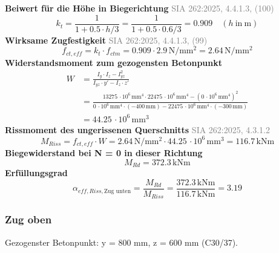 \documentclass[11pt,a4paper]{article}
\newcommand{\normref}[1]{{\small\textcolor{gray}{#1}}}
\begin{document}
\noindent\textbf{Beiwert für die Höhe in Biegerichtung} \hfill \normref{SIA 262:2025, 4.4.1.3, (100)}
\begin{equation*}
k_t = \frac{1}{1 + 0.5 \cdot h/3} = \frac{1}{1 + 0.5 \cdot 0.6/3} = 0.909 \quad \left(h\ \text{in}\ \mathrm{m}\right)
\end{equation*}
\noindent\textbf{Wirksame Zugfestigkeit} \hfill \normref{SIA 262:2025, 4.4.1.3, (99)}
\begin{equation*}
f_{ct,eff} = k_t \cdot f_{ctm} = 0.909 \cdot 2.9\,\mathrm{N}/\mathrm{mm}^{2} = 2.64\,\mathrm{N}/\mathrm{mm}^{2}
\end{equation*}
\noindent\textbf{Widerstandsmoment zum gezogensten Betonpunkt}
\begin{equation*}
\begin{aligned}
  W &= \frac{I_y \cdot I_z - I_{yz}^{2}}{I_{yz} \cdot y' - I_z \cdot z'} \\
  &= \frac{13275\,\cdot 10^{6}\,\mathrm{mm}^{4} \cdot 22475\,\cdot 10^{6}\,\mathrm{mm}^{4} - \left(0\,\cdot 10^{6}\,\mathrm{mm}^{4}\right)^{2}}{0\,\cdot 10^{6}\,\mathrm{mm}^{4} \cdot \left(-400\,\mathrm{mm}\right) - 22475\,\cdot 10^{6}\,\mathrm{mm}^{4} \cdot \left(-300\,\mathrm{mm}\right)} \\
  &= 44.25\,\cdot 10^{6}\,\mathrm{mm}^{3}
\end{aligned}
\end{equation*}
\noindent\textbf{Rissmoment des ungerissenen Querschnitts} \hfill \normref{SIA 262:2025, 4.3.1.2}
\begin{equation*}
M_{Riss} = f_{ct,eff} \cdot W = 2.64\,\mathrm{N}/\mathrm{mm}^{2} \cdot 44.25\,\cdot 10^{6}\,\mathrm{mm}^{3} = 116.7\,\mathrm{kNm}
\end{equation*}
\noindent\textbf{Biegewiderstand bei N = 0 in dieser Richtung}
\begin{equation*}
M_{Rd} = 372.3\,\mathrm{kNm}
\end{equation*}
\noindent\textbf{Erfüllungsgrad}
\begin{equation*}
\alpha_{eff,Riss,\text{Zug unten}} = \frac{M_{Rd}}{M_{Riss}} = \frac{372.3\,\mathrm{kNm}}{116.7\,\mathrm{kNm}} = 3.19
\end{equation*}
\subsubsection{Zug oben}
Gezogenster Betonpunkt: y = 800 mm, z = 600 mm (C30/37).
\end{document}
